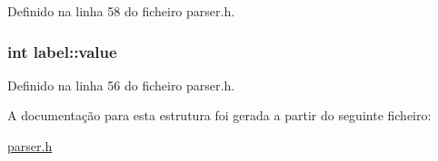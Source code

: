 Definido na linha 58 do ficheiro parser.\-h.

\hypertarget{structlabel_ac0cdaf20932b7fe75988a1d08510b72c}{
\subsubsection[{value}]{\setlength{\rightskip}{0pt plus 5cm}int label\-::value}}\label{structlabel_ac0cdaf20932b7fe75988a1d08510b72c}


Definido na linha 56 do ficheiro parser.\-h.



A documentação para esta estrutura foi gerada a partir do seguinte ficheiro\-:\begin{DoxyCompactItemize}
\item 
\hyperlink{parser_8h}{parser.\-h}\end{DoxyCompactItemize}
